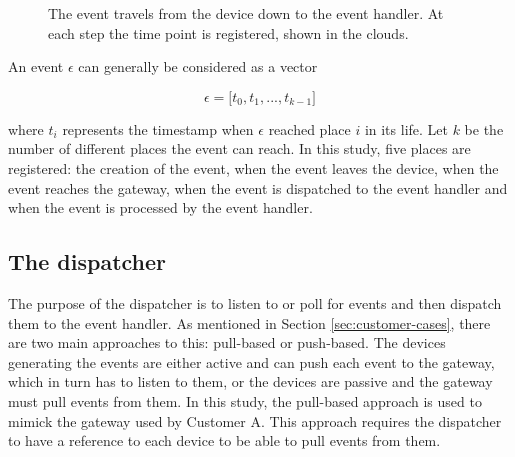 \begin{figure}[h!]
    \centering
    \caption{The event travels from the device down to the event handler. At
    each step the time point is registered, shown in the clouds.}
    \label{fig:event-life}
\end{figure}

An event $\epsilon$ can generally be considered as a vector

$$
\epsilon = \big[ t_0, t_1, ..., t_{k-1} \big]
$$

where $t_i$ represents the timestamp when $\epsilon$ reached place $i$ in its
life. Let $k$ be the number of different places the event can reach. In this
study, five places are registered: the creation of the event, when the event
leaves the device, when the event reaches the gateway, when the event is
dispatched to the event handler and when the event is processed by the event
handler.

\subsection{The dispatcher}

The purpose of the dispatcher is to listen to or poll for events and then
dispatch them to the event handler. As mentioned in Section
\ref{sec:customer-cases}, there are two main approaches to this: pull-based or
push-based. The devices generating the events are either active and can push
each event to the gateway, which in turn has to listen to them, or the devices
are passive and the gateway must pull events from them. In this study, the
pull-based approach is used to mimick the gateway used by Customer A. This
approach requires the dispatcher to have a reference to each device to be able
to pull events from them.

